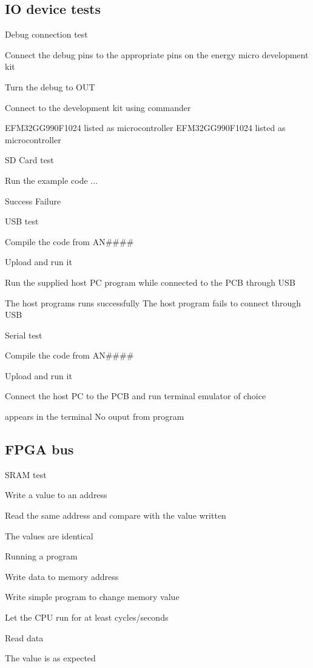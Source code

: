 \subsection{IO device tests}
\test
{Debug connection test}{
    \item{Connect the debug pins to the appropriate pins on the energy micro development kit}
    \item{Turn the debug to OUT}
    \item{Connect to the development kit using commander }
}{EFM32GG990F1024 listed as microcontroller}
{EFM32GG990F1024 listed as microcontroller}

\test
{SD Card test}{
    \item{Run the example code ...}
}{Success}
{Failure}

\test
{USB test}{
    \item{Compile the code from AN\#\#\#\#}
    \item{Upload and run it}
    \item{Run the supplied host PC program while connected to the PCB through USB}
}{The host programs runs successfully}
{The host program fails to connect through USB}

\test
{Serial test}{
    \item{Compile the code from AN\#\#\#\#}
    \item{Upload and run it}
    \item{Connect the host PC to the PCB and run terminal emulator of choice}
}{ appears in the terminal}
{No ouput from program}


\subsection{FPGA bus}
\test
{SRAM test}{
    \item{Write a value to an address}
    \item{Read the same address and compare with the value written}
}{The values are identical}
{}

\test
{Running a program}{
    \item{Write data to memory address}
    \item{Write simple program to change memory value}
    \item{Let the CPU run for at least  cycles/seconds}
    \item{Read data}
}{The value is as expected}
{}
